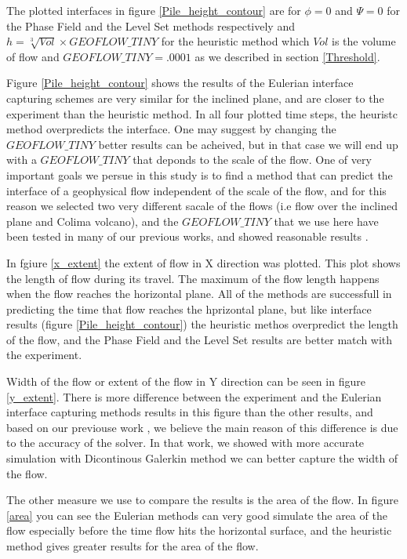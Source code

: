 \documentclass[letterpaper,10pt]{article}
\begin{document}
The plotted interfaces in figure \ref{Pile_height_contour} are for $\phi=0$ and $\varPsi=0$ for the Phase Field and the Level Set methods respectively and $h=\sqrt[3]{Vol} \times GEOFLOW\_TINY $ for the heuristic method which $Vol$ is the volume of flow and $GEOFLOW\_TINY= .0001 $ as we described in section \ref{Threshold}.

Figure \ref{Pile_height_contour} shows the results of the Eulerian interface capturing schemes are very similar for the inclined plane, and are closer to the experiment than the heuristic method. In all four plotted time steps, the heuristc method overpredicts the interface. One may suggest by changing the $GEOFLOW\_TINY $ better results can be acheived, but in that case we will end up with a  $GEOFLOW\_TINY $ that deponds to the scale of the flow. One of very important goals we persue in this study is to find a method that can predict the interface of a geophysical flow independent of the scale of the flow, and for this reason we selected two very different sacale of the flows (i.e flow over the inclined plane and Colima volcano), and the $GEOFLOW\_TINY $ that we use here have been tested in many of our previous works, and showed reasonable results \cite{Patra2005,Patra2006}. 

In fgiure \ref{x_extent} the extent of flow in X direction was plotted. This plot shows the length of flow during its travel. The maximum of the flow length happens when the flow reaches the horizontal plane. All of the methods are successfull in predicting the time that flow reaches the hprizontal plane, but like interface results (figure \ref{Pile_height_contour}) the heuristic methos overpredict the length of the flow, and the Phase Field and the Level Set results are better match with the experiment. 

Width of the flow or extent of the flow in Y direction can be seen in figure \ref{y_extent}. There is more difference between the experiment and the Eulerian interface capturing methods results in this figure than the other results, and based on our previouse work \cite{Patra2006}, we believe the main reason of this difference is due to the accuracy of the solver. In that work, we showed with more accurate simulation with Dicontinous Galerkin method we can better capture the width of the flow.

The other measure we use to compare the results is the area of the flow. In figure \ref{area} you can see the Eulerian methods can very good simulate the area of the flow  especially before the time flow hits the horizontal surface, and the heuristic method gives greater results for the area of the flow. 
\end{document}

